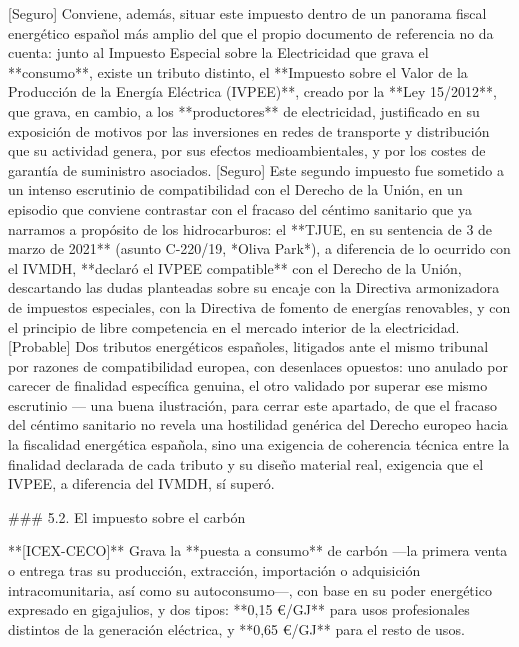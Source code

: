 \documentclass[10pt,a4paper]{article}
\begin{document}
[Seguro] Conviene, además, situar este impuesto dentro de un panorama fiscal energético español más amplio del que el propio documento de referencia no da cuenta: junto al Impuesto Especial sobre la Electricidad que grava el **consumo**, existe un tributo distinto, el **Impuesto sobre el Valor de la Producción de la Energía Eléctrica (IVPEE)**, creado por la **Ley 15/2012**, que grava, en cambio, a los **productores** de electricidad, justificado en su exposición de motivos por las inversiones en redes de transporte y distribución que su actividad genera, por sus efectos medioambientales, y por los costes de garantía de suministro asociados. [Seguro] Este segundo impuesto fue sometido a un intenso escrutinio de compatibilidad con el Derecho de la Unión, en un episodio que conviene contrastar con el fracaso del céntimo sanitario que ya narramos a propósito de los hidrocarburos: el **TJUE, en su sentencia de 3 de marzo de 2021** (asunto C-220/19, *Oliva Park*), a diferencia de lo ocurrido con el IVMDH, **declaró el IVPEE compatible** con el Derecho de la Unión, descartando las dudas planteadas sobre su encaje con la Directiva armonizadora de impuestos especiales, con la Directiva de fomento de energías renovables, y con el principio de libre competencia en el mercado interior de la electricidad. [Probable] Dos tributos energéticos españoles, litigados ante el mismo tribunal por razones de compatibilidad europea, con desenlaces opuestos: uno anulado por carecer de finalidad específica genuina, el otro validado por superar ese mismo escrutinio — una buena ilustración, para cerrar este apartado, de que el fracaso del céntimo sanitario no revela una hostilidad genérica del Derecho europeo hacia la fiscalidad energética española, sino una exigencia de coherencia técnica entre la finalidad declarada de cada tributo y su diseño material real, exigencia que el IVPEE, a diferencia del IVMDH, sí superó.

### 5.2. El impuesto sobre el carbón

**[ICEX-CECO]** Grava la **puesta a consumo** de carbón —la primera venta o entrega tras su producción, extracción, importación o adquisición intracomunitaria, así como su autoconsumo—, con base en su poder energético expresado en gigajulios, y dos tipos: **0,15 €/GJ** para usos profesionales distintos de la generación eléctrica, y **0,65 €/GJ** para el resto de usos.
\end{document}
